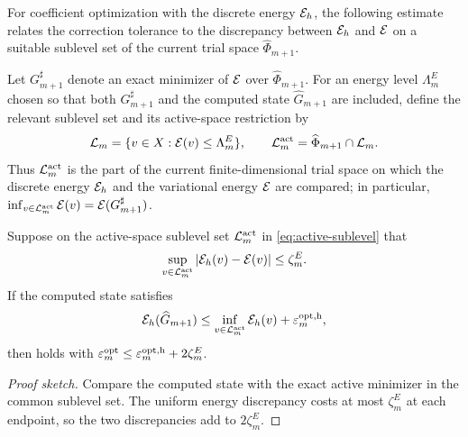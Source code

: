 For coefficient optimization with the discrete energy \(\mathcal{E}_h\),
the following estimate relates the correction tolerance to the
discrepancy between \(\mathcal{E}_h\) and \(\mathcal{E}\) on a suitable sublevel set of
the current trial space \(\widehat\Phi_{m+1}\).

Let \(G_{m+1}^{\sharp}\) denote an exact minimizer of \(\mathcal{E}\) over
\(\widehat\Phi_{m+1}\). For an energy level \(\Lambda_m^E\) chosen so that both
\(G_{m+1}^{\sharp}\) and the computed state \(\widehat G_{m+1}\) are included, define the relevant sublevel
set and its active-space restriction by
\begin{equation}
 \mathcal L_m=\{v\in X:\mathcal{E}(v)\leq\Lambda_m^E\},
 \qquad \mathcal L_m^{\rm act}=\widehat\Phi_{m+1}\cap\mathcal L_m.
 \label{eq:active-sublevel}
\end{equation}
Thus \(\mathcal L_m^{\rm act}\) is the part of the current finite-dimensional
trial space on which the discrete energy \(\mathcal{E}_h\) and the variational
energy \(\mathcal{E}\) are compared; in particular,
\(\inf_{v\in\mathcal L_m^{\rm act}}\mathcal{E}(v)=\mathcal{E}(G_{m+1}^{\sharp})\).

\begin{lemma}
\label{lem:energy-transfer}
Suppose on the active-space sublevel set \(\mathcal L_m^{\rm act}\) in
\cref{eq:active-sublevel} that
\[
 \sup_{v\in\mathcal L_m^{\rm act}}
 \left|\mathcal{E}_h(v)-\mathcal{E}(v)\right|\leq\zeta_m^E.
\]
If the computed state satisfies
\[
 \mathcal{E}_h(\widehat G_{m+1})\leq
 \inf_{v\in\mathcal L_m^{\rm act}}\mathcal{E}_h(v)+\varepsilon_m^{\rm opt,h},
\]
then  holds with
\(\varepsilon_m^{\rm opt}\leq\varepsilon_m^{\rm opt,h}+2\zeta_m^E\).
\end{lemma}

\begin{proof}[Proof sketch]
Compare the computed state with the exact active minimizer in the common sublevel set.  The uniform energy discrepancy costs at most $\zeta_m^E$ at each endpoint, so the two discrepancies add to $2\zeta_m^E$.
\end{proof}
